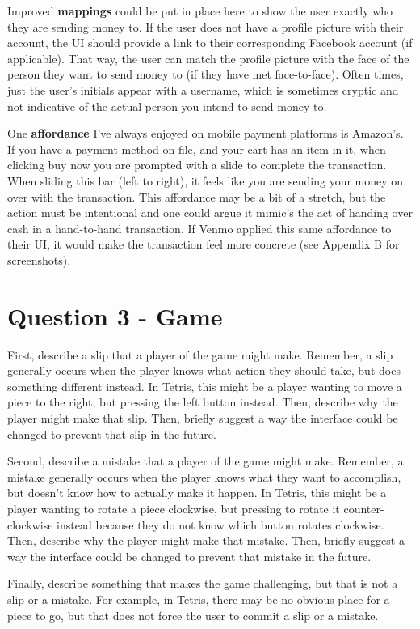 Improved \textbf{mappings} could be put in place here to show the user exactly who they are sending money to. If the user does not have a profile picture with their account, the UI should provide a link to their corresponding Facebook account (if applicable). That way, the user can match the profile picture with the face of the person they want to send money to (if they have met face-to-face). Often times, just the user's initials appear with a username, which is sometimes cryptic and not indicative of the actual person you intend to send money to.

One \textbf{affordance} I've always enjoyed on mobile payment platforms is Amazon's. If you have a payment method on file, and your cart has an item in it, when clicking buy now you are prompted with a slide to complete the transaction. When sliding this bar (left to right), it feels like you are sending your money on over with the transaction. This affordance may be a bit of a stretch, but the action must be intentional and one could argue it mimic's the act of handing over cash in a hand-to-hand transaction. If Venmo applied this same affordance to their UI, it would make the transaction feel more concrete (see Appendix B for screenshots).

\section{Question 3 - Game}

First, describe a slip that a player of the game might make. Remember, a slip generally occurs when the player knows what action they should take, but does something different instead. In Tetris, this might be a player wanting to move a piece to the right, but pressing the left button instead. Then, describe why the player might make that slip. Then, briefly suggest a way the interface could be changed to prevent that slip in the future.

Second, describe a mistake that a player of the game might make. Remember, a mistake generally occurs when the player knows what they want to accomplish, but doesn’t know how to actually make it happen. In Tetris, this might be a player wanting to rotate a piece clockwise, but pressing to rotate it counter-clockwise instead because they do not know which button rotates clockwise. Then, describe why the player might make that mistake. Then, briefly suggest a way the interface could be changed to prevent that mistake in the future.

Finally, describe something that makes the game challenging, but that is not a slip or a mistake. For example, in Tetris, there may be no obvious place for a piece to go, but that does not force the user to commit a slip or a mistake.

